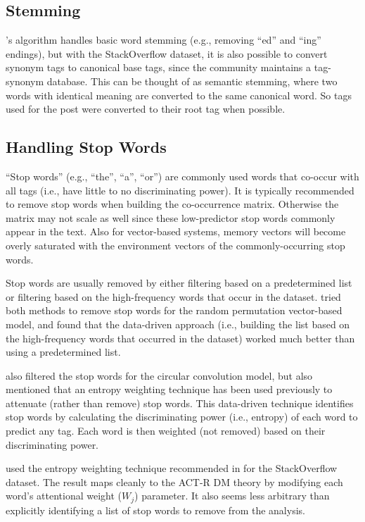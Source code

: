 \documentclass[man,floatsintext,donotrepeattitle]{apa6}
\begin{document}
\subsection{Stemming}

\textcite{Owoputi2013}'s algorithm handles basic word stemming (e.g., removing ``ed'' and ``ing'' endings), but
with the StackOverflow dataset, it is also possible to convert synonym tags to canonical base tags, since the community maintains a tag-synonym database.
This can be thought of as semantic stemming, where two words with identical meaning are converted to the same canonical word.
So tags used for the post were converted to their root tag when possible.

\subsection{Handling Stop Words}

``Stop words'' (e.g., ``the'', ``a'', ``or'') are commonly used words that co-occur with all tags (i.e., have little to no discriminating power).
It is typically recommended \parencite{Bird2009} to remove stop words when building the co-occurrence matrix.
Otherwise the matrix may not scale as well since these low-predictor stop words commonly appear in the text.
Also for vector-based systems, memory vectors will become overly saturated with the environment vectors of the commonly-occurring stop words.

Stop words are usually removed by either filtering based on a predetermined list or filtering based on the high-frequency words that occur in the dataset.
\textcite{Sahlgren2008} tried both methods to remove stop words for the random permutation vector-based model, and found that the data-driven approach
(i.e., building the list based on the high-frequency words that occurred in the dataset) worked much better than using a predetermined list.

\textcite{Jones2007} also filtered the stop words for the circular convolution model,
but also mentioned that an entropy weighting technique \parencite{Dumais1991} has been used previously to attenuate (rather than remove) stop words.
This data-driven technique identifies stop words by calculating the discriminating power (i.e., entropy) of each word to predict any tag.
Each word is then weighted (not removed) based on their discriminating power.

\textcite{Stanley2013} used the entropy weighting technique recommended in \textcite{Dumais1991} for the StackOverflow dataset.
The result maps cleanly to the ACT-R DM theory by modifying each word's attentional weight ($W_{j}$) parameter.
It also seems less arbitrary than explicitly identifying a list of stop words to remove from the analysis.
\end{document}
